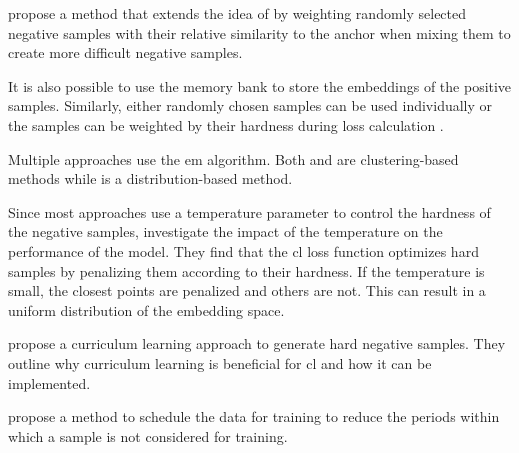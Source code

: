 \citet{progcl_2022} propose a method that extends the idea of \citet{mochi_2020} by weighting randomly selected negative samples 
with their relative similarity to the anchor when mixing them to create more difficult negative samples.

It is also possible to use the memory bank to store the embeddings of the positive samples.
Similarly, either randomly chosen samples can be used individually or 
the samples can be weighted by their hardness during loss calculation \citet{mining_potential_2024}.


Multiple approaches use the \ac{em} algorithm.
Both \citet{DRC_2020} and \citet{PCL_2021} are clustering-based methods while \citet{progcl_2022} is a distribution-based method.

Since most approaches use a temperature parameter to control the hardness of the negative samples, 
\citet{CL_temp_2021,grape_2024} investigate the impact of the temperature on the performance of the model.
They find that the \ac{cl} loss function optimizes hard samples by penalizing them according to their hardness.
If the temperature is small, the closest points are penalized and others are not.
This can result in a uniform distribution of the embedding space.

\citet{curricular_weighting_2024} propose a curriculum learning approach to generate hard negative samples.
They outline why curriculum learning is beneficial for \ac{cl} and how it can be implemented.

\citet{PIC_2020} propose a method to schedule the data for training 
to reduce the periods within which a sample is not considered for training.